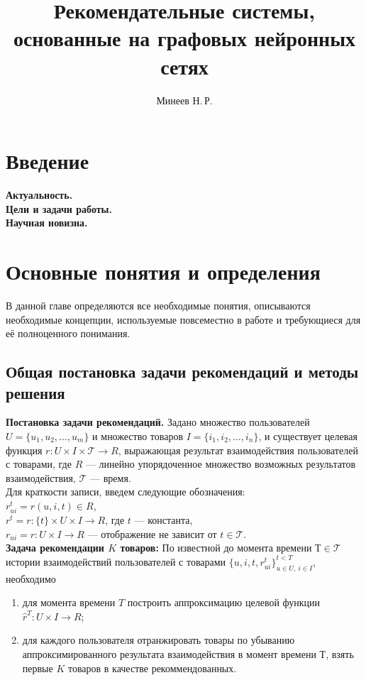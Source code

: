 \documentclass{mipt-thesis-ms}
\title{Рекомендательные системы, основанные на графовых нейронных сетях}
\author{Минеев Н.\,Р.}
\begin{document}
\frontmatter
\titlecontents

\mainmatter


\chapter{Введение}
{\bf Актуальность.}\\

{\bf Цели и задачи работы.}\\

{\bf Научная новизна.}\\

\chapter{Основные понятия и определения}

В данной главе определяются все необходимые понятия, описываются необходимые концепции, используемые повсеместно в работе и требующиеся для её полноценного понимания.


\section{Общая постановка задачи рекомендаций и методы решения}
{\bf Постановка задачи рекомендаций.} 
Задано множество пользователей $U = \{u_1, u_2, \dots, u_m\}$ и множество товаров $I = \{i_1, i_2, \dots, i_n\}$, и существует целевая функция $r: U \times I \times \mathcal{T} \rightarrow R$, выражающая результат взаимодействия пользователей с товарами, где $R$ --- линейно упорядоченное множество возможных результатов взаимодействия, $\mathcal{T}$ --- время.\\

Для краткости записи, введем следующие обозначения: \\
$r^t_{ui} = r(u, i, t) \in R$, \\
$r^t = r:\{t\} \times U \times I \rightarrow R$, где $t$ --- константа, \\
$r_{ui} = r: U \times I \rightarrow R$ --- отображение не зависит от $t \in \mathcal{T}$.\\

{\bf Задача рекомендации $K$ товаров:} По известной до момента времени $Т \in \mathcal{T}$ истории взаимодействий пользователей с товарами $\{u, i, t, r_{ui}^t\}^{t<T}_{u \in U,\:i \in I}$, необходимо 
\begin{enumerate}
    \item для момента времени $T$ построить аппроксимацию целевой функции $\hat r^T: U \times I \rightarrow R$;
    \item для каждого пользователя отранжировать товары по убыванию аппроксимированного результата взаимодействия в момент времени $Т$, взять первые $K$ товаров в качестве рекоммендованных.
\end{enumerate}
\end{document}
